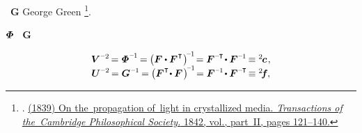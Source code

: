 ~$\bm{G}$
George Green\hspace{-0.1ex}%
\footnote{%
\href{https://en.wikipedia.org/wiki/George_Green_(mathematician)}{}.
\href{https://hdl.handle.net/2027/mdp.39015027059651?urlappend=\%3Bseq=133}{(1839) On the~propagation of~light in crystallized media. \emph{Transactions of the~Cambridge Philosophical Society.} 1842, vol., part~II, pages 121\hbox{--}140.}
}\hspace{-0.5ex}.

$\mathboldPhi$
~$\bm{G}$
  

\nopagebreak\vspace{-0.2em}\begin{equation}\label{moredeformationtensors.nonlinear}
\begin{array}{c}
\bm{V}^{\expminustwo} \hspace{-0.25ex}
= \mathboldPhi^{\expminusone} \hspace{-0.2ex}
= \hspace{-0.1ex} \left( \bm{F} \dotp \bm{F}^{\hspace{.1ex}\T} \hspace{.1ex} \right)^{\hspace{-0.33ex}\expminusone} \hspace{-0.4ex}
= \bm{F}^{\expminusT} \hspace{-0.3ex} \dotp \bm{F}^{\expminusone} \hspace{-0.25ex}
\equiv {^2\hspace{-0.2ex}\bm{c}}
\hspace{.2ex} ,
\\
%
\bm{U}^{\expminustwo} \hspace{-0.25ex}
= \bm{G}^{\hspace{.12ex}\expminusone} \hspace{-0.2ex}
= \hspace{-0.1ex} \left( \bm{F}^{\hspace{.1ex}\T} \hspace{-0.4ex} \dotp \bm{F} \hspace{.2ex} \right)^{\hspace{-0.33ex}\expminusone} \hspace{-0.4ex}
= \bm{F}^{\expminusone} \hspace{-0.3ex} \dotp \bm{F}^{\expminusT} \hspace{-0.3ex}
\equiv {^2\hspace{-0.4ex}\bm{f}}
\hspace{-0.1ex} ,
\end{array}
\end{equation}

